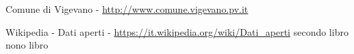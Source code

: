\begin{thebibliography}{100}

 Comune di Vigevano - \url{http://www.comune.vigevano.pv.it}


  Wikipedia - Dati aperti - \url{https://it.wikipedia.org/wiki/Dati_aperti}
 secondo libro
 nono libro
\end{thebibliography} 